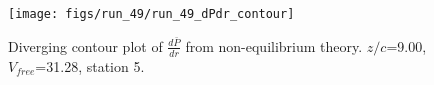 \begin{figure}[H]
\centering
\texttt{[image: figs/run\_49/run\_49\_dPdr\_contour]}
\caption{Diverging contour plot of $\frac{d\bar{P}}{dr}$ from non-equilibrium theory. $z/c$=9.00, $V_{free}$=31.28, station 5.}
\label{fig:run_49_dPdr_contour}
\end{figure}


